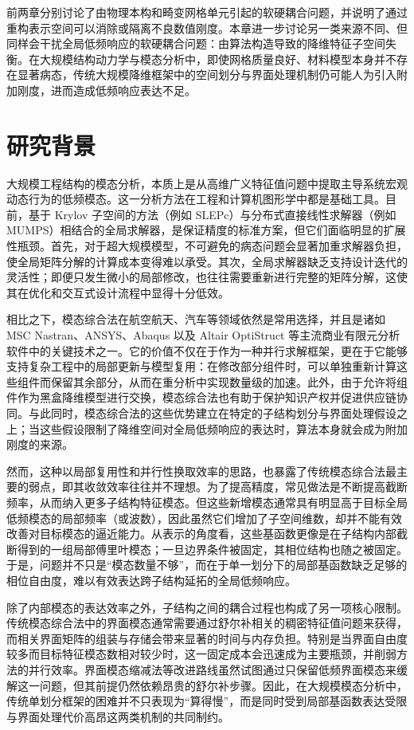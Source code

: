 前两章分别讨论了由物理本构和畸变网格单元引起的软硬耦合问题，并说明了通过重构表示空间可以消除或隔离不良数值刚度。本章进一步讨论另一类来源不同、但同样会干扰全局低频响应的软硬耦合问题：由算法构造导致的降维特征子空间失衡。在大规模结构动力学与模态分析中，即使网格质量良好、材料模型本身并不存在显著病态，传统大规模降维框架中的空间划分与界面处理机制仍可能人为引入附加刚度，进而造成低频响应表达不足。
\section{研究背景}
大规模工程结构的模态分析，本质上是从高维广义特征值问题中提取主导系统宏观动态行为的低频模态。这一分析方法在工程和计算机图形学中都是基础工具。目前，基于 Krylov 子空间的方法（例如 SLEPc\cite{Hernandez2005SLEPc}）与分布式直接线性求解器（例如 MUMPS\cite{MUMPS:1, MUMPS:2}）相结合的全局求解器，是保证精度的标准方案，但它们面临明显的扩展性瓶颈。首先，对于超大规模模型，不可避免的病态问题会显著加重求解器负担，使全局矩阵分解的计算成本变得难以承受。其次，全局求解器缺乏支持设计迭代的灵活性；即便只发生微小的局部修改，也往往需要重新进行完整的矩阵分解，这使其在优化和交互式设计流程中显得十分低效。

相比之下，模态综合法在航空航天、汽车等领域依然是常用选择，并且是诸如 MSC Nastran、ANSYS、Abaqus 以及 Altair OptiStruct\cite{Vysok2017CurrentCO} 等主流商业有限元分析软件中的关键技术之一。它的价值不仅在于作为一种并行求解框架，更在于它能够支持复杂工程中的局部更新与模型复用：在修改部分组件时，可以单独重新计算这些组件而保留其余部分，从而在重分析中实现数量级的加速。此外，由于允许将组件作为黑盒降维模型进行交换，模态综合法也有助于保护知识产权并促进供应链协同。与此同时，模态综合法的这些优势建立在特定的子结构划分与界面处理假设之上；当这些假设限制了降维空间对全局低频响应的表达时，算法本身就会成为附加刚度的来源。

然而，这种以局部复用性和并行性换取效率的思路，也暴露了传统模态综合法最主要的弱点，即其收敛效率往往并不理想。为了提高精度，常见做法是不断提高截断频率，从而纳入更多子结构特征模态。但这些新增模态通常具有明显高于目标全局低频模态的局部频率（或波数），因此虽然它们增加了子空间维数，却并不能有效改善对目标模态的逼近能力。从表示的角度看，这些基函数更像是在子结构内部截断得到的一组局部傅里叶模态；一旦边界条件被固定，其相位结构也随之被固定。于是，问题并不只是“模态数量不够”，而在于单一划分下的局部基函数缺乏足够的相位自由度，难以有效表达跨子结构延拓的全局低频响应。

除了内部模态的表达效率之外，子结构之间的耦合过程也构成了另一项核心限制。传统模态综合法中的界面模态通常需要通过舒尔补相关的稠密特征值问题来获得，而相关界面矩阵的组装与存储会带来显著的时间与内存负担。特别是当界面自由度较多而目标特征模态数相对较少时，这一固定成本会迅速成为主要瓶颈，并削弱方法的并行效率。界面模态缩减法等改进路线虽然试图通过只保留低频界面模态来缓解这一问题，但其前提仍然依赖昂贵的舒尔补步骤。因此，在大规模模态分析中，传统单划分框架的困难并不只表现为“算得慢”，而是同时受到局部基函数表达受限与界面处理代价高昂这两类机制的共同制约。

